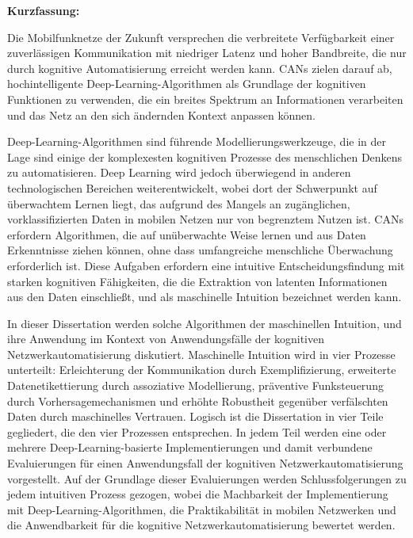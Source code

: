 \thispagestyle{empty}
\vspace*{6\baselineskip}

\glsresetall

{\large\textbf{Kurzfassung:} }
\par

Die Mobilfunknetze der Zukunft versprechen die verbreitete Verfügbarkeit einer zuverlässigen Kommunikation mit niedriger Latenz und hoher Bandbreite, die nur durch kognitive Automatisierung erreicht werden kann.
\acp{CAN} zielen darauf ab, hochintelligente Deep-Learning-Algorithmen als Grundlage der kognitiven Funktionen zu verwenden, die ein breites Spektrum an Informationen verarbeiten und das Netz an den sich ändernden Kontext anpassen können.

Deep-Learning-Algorithmen sind führende Modellierungswerkzeuge, die in der Lage sind einige der komplexesten kognitiven Prozesse des menschlichen Denkens zu automatisieren.
Deep Learning wird jedoch überwiegend in anderen technologischen Bereichen weiterentwickelt, wobei dort der Schwerpunkt auf überwachtem Lernen liegt, das aufgrund des Mangels an zugänglichen, vorklassifizierten Daten in mobilen Netzen nur von begrenztem Nutzen ist.
\acp{CAN} erfordern Algorithmen, die auf unüberwachte Weise lernen und aus Daten Erkenntnisse ziehen können, ohne dass umfangreiche menschliche Überwachung erforderlich ist.
Diese Aufgaben erfordern eine intuitive Entscheidungsfindung mit starken kognitiven Fähigkeiten, die die Extraktion von latenten Informationen aus den Daten einschließt, und als maschinelle Intuition bezeichnet werden kann.

In dieser Dissertation werden solche Algorithmen der maschinellen Intuition, und ihre Anwendung im Kontext von Anwendungsfälle der kognitiven Netzwerkautomatisierung diskutiert.
Maschinelle Intuition wird in vier Prozesse unterteilt: Erleichterung der Kommunikation durch Exemplifizierung, erweiterte Datenetikettierung durch assoziative Modellierung, präventive Funksteuerung durch Vorhersagemechanismen und erhöhte Robustheit gegenüber verfälschten Daten durch maschinelles Vertrauen.
Logisch ist die Dissertation in vier Teile gegliedert, die den vier Prozessen entsprechen.
In jedem Teil werden eine oder mehrere Deep-Learning-basierte Implementierungen und damit verbundene Evaluierungen für einen Anwendungsfall der kognitiven Netzwerkautomatisierung vorgestellt.
Auf der Grundlage dieser Evaluierungen werden Schlussfolgerungen zu jedem intuitiven Prozess gezogen, wobei die Machbarkeit der Implementierung mit Deep-Learning-Algorithmen, die Praktikabilität in mobilen Netzwerken und die Anwendbarkeit für die kognitive Netzwerkautomatisierung bewertet werden.

